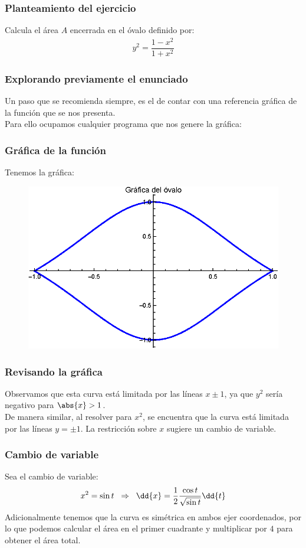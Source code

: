 \begin{frame}
\frametitle{Planteamiento del ejercicio}
Calcula el área $A$ encerrada en el óvalo definido por:
\begin{align*}
y^{2} = \dfrac{1 - x^{2}}{1 + x^{2}}
\end{align*}
\end{frame}
\begin{frame}
\frametitle{Explorando previamente el enunciado}
Un paso que se recomienda siempre, es el de contar con una referencia gráfica de la función que se nos presenta.
\\
\bigskip
\pause
Para ello ocupamos cualquier programa que nos genere la gráfica:
\end{frame}
\begin{frame}
\frametitle{Gráfica de la función}
Tenemos la gráfica:
\begin{figure}
    \centering
    \includegraphics[scale=1]{Imagenes/Asesoria_03_02.eps}
\end{figure}
\end{frame}
\begin{frame}
\frametitle{Revisando la gráfica}
Observamos que esta curva está limitada por las líneas $x \pm 1$, ya que $y^{2}$ sería negativo para $\abs{x} > 1$.
\\
\bigskip
\pause
De manera similar, al resolver para $x^{2}$, se encuentra que la curva está limitada por las líneas $y = \pm 1$. La restricción sobre $x$ sugiere un cambio de variable.
\end{frame}
\begin{frame}
\frametitle{Cambio de variable}
Sea el cambio de variable:
\begin{align*}
x^{2} = \sin t \hspace{0.2cm} \Rightarrow \hspace{0.2cm} \dd{x} = \dfrac{1}{2} \dfrac{\cos t}{\sqrt{\sin t}} \dd{t}
\end{align*}
\pause
Adicionalmente tenemos que la curva es simétrica en ambos ejer coordenados, por lo que podemos calcular el área en el primer cuadrante y multiplicar por $4$ para obtener el área total.
\end{frame}
